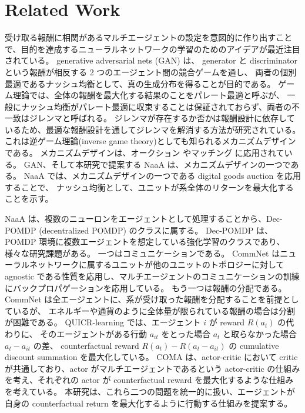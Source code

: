 \section{Related Work}

受け取る報酬に相関があるマルチエージェントの設定を意図的に作り出すことで、目的を達成するニューラルネットワークの学習のためのアイデアが最近注目されている。
generative adversarial nets (GAN) \citep{goodfellow2014generative} は、
generator と discriminator という報酬が相反する 2 つのエージェント間の競合ゲームを通し、
両者の個別最適であるナッシュ均衡として、真の生成分布を得ることが目的である。 %
ゲーム理論では、全体の報酬を最大化する結果のことをパレート最適と呼ぶが、
一般にナッシュ均衡がパレート最適に収束することは保証されておらず、両者の不一致はジレンマと呼ばれる。
ジレンマが存在するか否かは報酬設計に依存しているため、最適な報酬設計を通してジレンマを解消する方法が研究されている。
これは逆ゲーム理論(inverse game theory)としても知られるメカニズムデザイン\citep{myerson1983mechanism}である。
メカニズムデザインは、オークション \citep{vickrey1961counterspeculation} やマッチング \citep{gale1962college} に応用されている。
GAN、そして本研究で提案する NaaA は、メカニズムデザインの一つである。
NaaA では、メカニズムデザインの一つである digital goods auction \citep{guruswami2005profit} を応用することで、
ナッシュ均衡として、ユニットが系全体のリターンを最大化することを示す。

NaaA は、複数のニューロンをエージェントとして処理することから、Dec-POMDP (decentralized POMDP) のクラスに属する。
Dec-POMDP は、POMDP 環境に複数エージェントを想定している強化学習のクラスであり、様々な研究課題がある。
一つはコミュニケーションである。
CommNet \citep{sukhbaatar2016learning} はニューラルネットワークに属するユニットが他のユニットのトポロジーに対して agnostic である性質を応用し、マルチエージェントのコミュニケーションの訓練にバックプロパゲーションを応用している。
もう一つは報酬の分配である。CommNet は全エージェントに、系が受け取った報酬を分配することを前提としているが、
エネルギーや通貨のように全体量が限られている報酬の場合は分割が困難である。
QUICR-learning \citep{agogino2006quicr} では、エージェント $i$ が reward $R(a_t)$ の代わりに、
そのエージェントがある行動 $a_{it}$ をとった場合 $a_t$ と取らなかった場合 $a_t-a_{it}$ の差、
counterfactual reward $R(a_t) - R(a_t - a_{it})$ の cumulative discount summation を最大化している。
COMA \citep{foerster2017counterfactual} は、actor-critic において critic が共通しており、actor がマルチエージェントであるという actor-critic の仕組みを考え、それぞれの actor が counterfactual reward を最大化するような仕組みを考えている。
本研究は、これら二つの問題を統一的に扱い、エージェントが自身の counterfactual return を最大化するように行動する仕組みを提案する。


